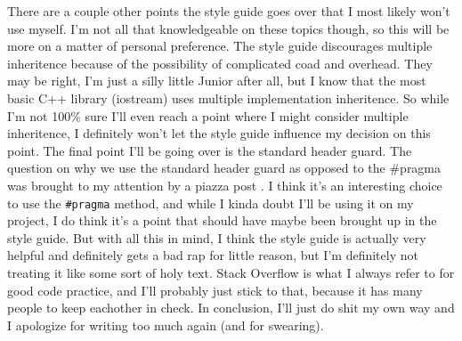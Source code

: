 \documentclass[11pt]{article}
\begin{document}
There are a couple other points the style guide goes over that I most likely won't use myself.  I'm 
not all that knowledgeable on these topics though, so this will be more on a matter of personal 
preference.  The style guide discourages multiple inheritence because of the possibility of 
complicated coad and overhead.  They may be right, I'm just a silly little Junior after all, but I know 
that the most basic C++ library (iostream) uses multiple implementation inheritence.  So while I'm not 
100\% sure I'll even reach a point where I might consider multiple inheritence, I definitely won't let 
the style guide influence my decision on this point.  The final point I'll be going over is the standard 
header guard.  The question on why we use the standard header guard as opposed to the #pragma was 
brought to my attention by a piazza post \cite{tom}.  I think it's an interesting choice to use the 
\texttt{\#pragma} method, and while I kinda doubt I'll be using it on my project, I do think it's a point 
that should have maybe been brought up in the style guide.  But with all this in mind, I think the style 
guide is actually very helpful and definitely gets a bad rap for little reason, but I'm definitely not 
treating it like some sort of holy text.  Stack Overflow is what I always refer to for good code practice, 
and I'll probably just stick to that, because it has many people to keep eachother in check.  In conclusion, 
I'll just do shit my own way and I apologize for writing too much again (and for swearing). \\\\



\end{document}
